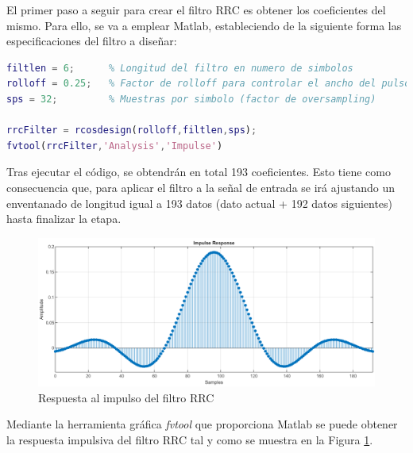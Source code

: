 \vspace{3mm}

El primer paso a seguir para crear el filtro RRC es obtener los coeficientes del mismo. Para ello, se va a emplear Matlab, estableciendo de la siguiente forma las especificaciones del filtro a diseñar:

\vspace{5mm}

\begin{lstlisting}[language=matlab, style=mystyle, caption={Diseño del filtro RRC en Matlab}]
filtlen = 6;      % Longitud del filtro en numero de simbolos
rolloff = 0.25;   % Factor de rolloff para controlar el ancho del pulso
sps = 32;         % Muestras por simbolo (factor de oversampling)

rrcFilter = rcosdesign(rolloff,filtlen,sps);
fvtool(rrcFilter,'Analysis','Impulse')
\end{lstlisting}

\vspace{3mm}

Tras ejecutar el código, se obtendrán en total 193 coeficientes. Esto tiene como consecuencia que, para aplicar el filtro a la señal de entrada se irá ajustando un enventanado de longitud igual a 193 datos (dato actual + 192 datos siguientes) hasta finalizar la etapa. 

\vspace{3mm}

\begin{figure}[h]
	\centering
	\includegraphics[width=1\textwidth]{img/matlab/rrc.PNG}
	\caption{Respuesta al impulso del filtro RRC}
	\label{fig:fvtool}
\end{figure}
    
\vspace{3mm}

Mediante la herramienta gráfica \textit{fvtool} que proporciona Matlab se puede obtener la respuesta impulsiva del filtro RRC tal y como se muestra en la Figura \ref{fig:fvtool}.


